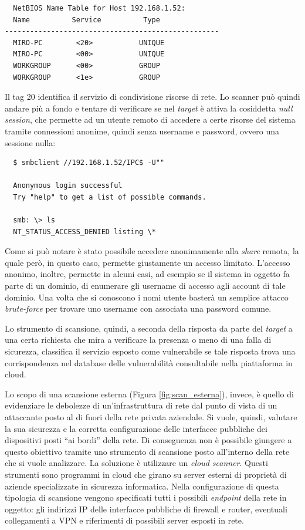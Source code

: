 \documentclass[target=mst,aauheader=]{thud}
\begin{document}
\begin{verbatim}
  NetBIOS Name Table for Host 192.168.1.52:
  Name          Service          Type
---------------------------------------------------
  MIRO-PC        <20>           UNIQUE
  MIRO-PC        <00>           UNIQUE
  WORKGROUP      <00>           GROUP
  WORKGROUP      <1e>           GROUP
\end{verbatim}

Il tag 20 identifica il servizio di condivisione risorse di rete. Lo scanner può quindi andare più a fondo e tentare di verificare se nel \textit{target} è attiva la cosiddetta \textit{null session}, che permette ad un utente remoto di accedere a certe risorse del sistema tramite connessioni anonime, quindi senza username e password, ovvero una sessione nulla:

\begin{verbatim}
  $ smbclient //192.168.1.52/IPC$ -U""

  Anonymous login successful
  Try "help" to get a list of possible commands.
  
  smb: \> ls
  NT_STATUS_ACCESS_DENIED listing \*
\end{verbatim}

Come si può notare è stato possibile accedere anonimamente alla \textit{share} remota, la quale però, in questo caso, permette giustamente un accesso limitato. L’accesso anonimo, inoltre, permette in alcuni casi, ad esempio se il sistema in oggetto fa parte di un dominio, di enumerare gli username di accesso agli account di tale dominio. Una volta che si conoscono i nomi utente basterà un semplice attacco \textit{brute-force} per trovare uno username con associata una password comune.

Lo strumento di scansione, quindi, a seconda della risposta da parte del \textit{target} a una certa richiesta che mira a verificare la presenza o meno di una falla di sicurezza, classifica il servizio esposto come vulnerabile se tale risposta trova una corrispondenza nel database delle vulnerabilità consultabile nella piattaforma in cloud.

Lo scopo di una scansione esterna (Figura \ref{fig:scan_esterna}), invece, è quello di evidenziare le debolezze di un’infrastruttura di rete dal punto di vista di un attaccante posto al di fuori della rete privata aziendale. Si vuole, quindi, valutare la sua sicurezza e la corretta configurazione delle interfacce pubbliche dei dispositivi posti “ai bordi” della rete. Di conseguenza non è possibile giungere a questo obiettivo tramite uno strumento di scansione posto all’interno della rete che si vuole analizzare. La soluzione è utilizzare un \textit{cloud scanner}. Questi strumenti sono programmi in cloud che girano su server esterni di proprietà di aziende specializzate in sicurezza informatica. Nella configurazione di questa tipologia di scansione vengono specificati tutti i possibili \textit{endpoint} della rete in oggetto: gli indirizzi IP delle interfacce pubbliche di firewall e router, eventuali collegamenti a VPN e riferimenti di possibili server esposti in rete.
\end{document}
